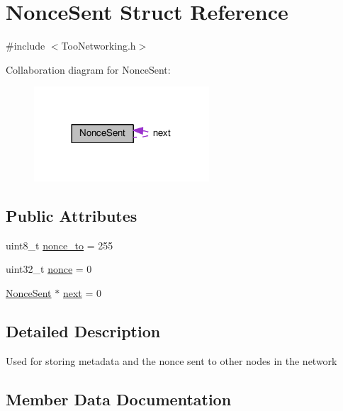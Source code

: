 \hypertarget{structNonceSent}{}\section{Nonce\+Sent Struct Reference}
\label{structNonceSent}


{\ttfamily \#include $<$Too\+Networking.\+h$>$}



Collaboration diagram for Nonce\+Sent\+:
\nopagebreak
\begin{figure}[H]
\begin{center}
\leavevmode
\includegraphics[width=185pt]{structNonceSent__coll__graph}
\end{center}
\end{figure}
\subsection*{Public Attributes}
\begin{DoxyCompactItemize}
\item 
uint8\+\_\+t \hyperlink{structNonceSent_ad5484888a11a0c041610c38b564c5627}{nonce\+\_\+to} = 255
\item 
uint32\+\_\+t \hyperlink{structNonceSent_ae9d167a911c22c9d4490d2fee2093c10}{nonce} = 0
\item 
\hyperlink{structNonceSent}{Nonce\+Sent} $\ast$ \hyperlink{structNonceSent_a1c51c6d93e58ff1d94a0ab691c28fd24}{next} = 0
\end{DoxyCompactItemize}


\subsection{Detailed Description}
Used for storing metadata and the nonce sent to other nodes in the network 

\subsection{Member Data Documentation}
\mbox{\label{structNonceSent_a1c51c6d93e58ff1d94a0ab691c28fd24}} 
